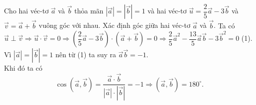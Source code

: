 
\begin{bt}%
	Cho hai véc-tơ $\overrightarrow{a}$ và $\overrightarrow{b}$ thỏa mãn $\left |\overrightarrow{a} \right |=\left |\overrightarrow{b} \right |=1$ và hai véc-tơ $\overrightarrow{u}=\dfrac{2}{5}\overrightarrow{a}-3\overrightarrow{b}$ và $\overrightarrow{v}=\overrightarrow{a}+\overrightarrow{b}$ vuông góc với nhau. Xác định góc giữa hai véc-tơ $\overrightarrow{a}$ và $\overrightarrow{b}$.
	\loigiai
	{
		Ta có $\overrightarrow{u}\perp\overrightarrow{v}\Rightarrow\overrightarrow{u}\cdot\overrightarrow{v}=0\Rightarrow\left (\dfrac{2}{5}\overrightarrow{a}-3\overrightarrow{b} \right )\cdot\left (\overrightarrow{a}+\overrightarrow{b} \right )=0\Rightarrow \dfrac{2}{5}\overrightarrow{a}^2-\dfrac{13}{5}\overrightarrow{a}\overrightarrow{b}-3\overrightarrow{b}^2=0$ (1).\\
		Vì $\left |\overrightarrow{a} \right |=\left |\overrightarrow{b} \right |=1$ nên từ (1) ta suy ra $\overrightarrow{a}\overrightarrow{b}=-1$.\\
		Khi đó ta có $$\cos\left (\overrightarrow{a},\overrightarrow{b} \right )=\dfrac{\overrightarrow{a}\cdot\overrightarrow{b}}{\left |\overrightarrow{a} \right |\cdot\left |\overrightarrow{b} \right |}=-1\Rightarrow\left (\overrightarrow{a},\overrightarrow{b} \right )=180^{\circ}.$$
	}
\end{bt}

